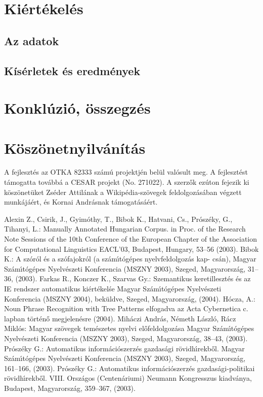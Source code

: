 \documentclass{llncs}
\begin{document}
\section{Kiértékelés}

\subsection{Az adatok}

\subsection{Kísérletek és eredmények}

\section{Konklúzió, összegzés}

\section*{Köszönetnyilvánítás}
A fejlesztés az OTKA 82333 számú projektjén belül valósult meg. A fejlesztést támogatta továbbá a CESAR projekt (No. 271022). A szerzők ezúton fejezik ki köszönetüket Zséder Attilának a Wikipédia-szövegek feldolgozásában végzett munkájáért, és Kornai Andrásnak támogatásáért. %

%
%
\begin{thebibliography}{15}
%
Alexin Z., Csirik, J., Gyim\'othy, T., Bibok K., Hatvani, Cs.,
Pr\'osz\'eky, G., Tihanyi, L.:
Manually Annotated Hungarian Corpus.
in Proc. of the Research Note Sessions of the 10th Conference
of the European Chapter of the Association for Computational
Linguistics EACL'03, Budapest, Hungary, 53--56 (2003).
%
Bibok K.:
A sz\'or\'ol \'es a sz\'ofajokr\'ol (a sz\'am\'\i t\'og\'epes nyelvfeldolgoz\'as kap- cs\'an),
Magyar Sz\'am\'\i t\'og\'epes Nyelv\'eszeti Konferencia (MSZNY 2003),
Szeged, Magyarorsz\'ag, 31--36, (2003).
%
Farkas R., Konczer K., Szarvas Gy.:
Szemantikus keretilleszt\'es \'es az IE rendszer automatikus ki\'ert\'ekel\'se
Magyar Sz\'am\'\i t\'og\'epes Nyelv\'eszeti Konferencia (MSZNY 2004),
bek\"uldve, Szeged, Magyarorsz\'ag, (2004).
%
H\'ocza, A.:
Noun Phrase Recognition with Tree Patterns
elfogadva az Acta Cybernetica c. lapban t\"ort\'en\H{o} megjelen\'esre (2004).
%
Mih\'aczi Andr\'as, N\'emeth L\'aszl\'o, R\'acz Mikl\'os:
Magyar sz\"ovegek tem\'eszetes nyelvi el\H{o}feldolgoz\'asa
Magyar Sz\'am\'\i t\'og\'epes Nyelv\'eszeti Konferencia (MSZNY 2003),
Szeged, Magyarorsz\'ag, 38--43, (2003).
%
Pr\'osz\'eky G.:
Automatikus inform\'aci\'oszerz\'es gazdas\'agi r\"ovidh\'\i rekb\H{o}l.
Magyar Sz\'am\'\i t\'og\'epes Nyelv\'eszeti Konferencia (MSZNY 2003),
Szeged, Magyarorsz\'ag, 161--166, (2003).
%
Pr\'osz\'eky G.:
Automatikus inform\'aci\'oszerz\'es gazdas\'agi-politikai r\"ovidh\'\i rekb\H{o}l.
VIII. Orsz\'agos (Centen\'ariumi) Neumann Kongresszus kiadv\'anya,
Budapest, Magyarorsz\'ag, 359--367, (2003).
%
\end{thebibliography}
\end{document}
